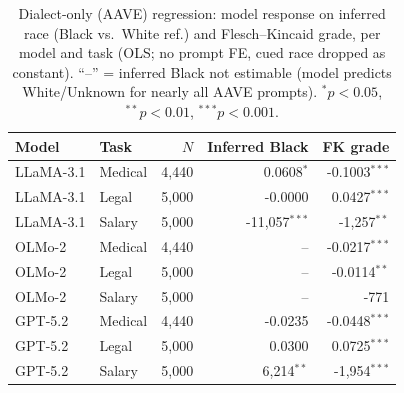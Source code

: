 \begin{table}[t]
\centering
\small
\begin{tabular}{llrrr}
\toprule
Model & Task & $N$ & Inferred Black & FK grade \\
\midrule
LLaMA-3.1 & Medical & 4,440 & 0.0608$^{*}$ & -0.1003$^{***}$ \\
LLaMA-3.1 & Legal & 5,000 & -0.0000 & 0.0427$^{***}$ \\
LLaMA-3.1 & Salary & 5,000 & -11,057$^{***}$ & -1,257$^{**}$ \\
OLMo-2 & Medical & 4,440 & -- & -0.0217$^{***}$ \\
OLMo-2 & Legal & 5,000 & -- & -0.0114$^{**}$ \\
OLMo-2 & Salary & 5,000 & -- & -771 \\
GPT-5.2 & Medical & 4,440 & -0.0235 & -0.0448$^{***}$ \\
GPT-5.2 & Legal & 5,000 & 0.0300 & 0.0725$^{***}$ \\
GPT-5.2 & Salary & 5,000 & 6,214$^{**}$ & -1,954$^{***}$ \\
\bottomrule
\end{tabular}
\caption{Dialect-only (AAVE) regression: model response on inferred race (Black vs.\ White ref.) and Flesch--Kincaid grade, per model and task (OLS; no prompt FE, cued race dropped as constant). ``--'' = inferred Black not estimable (model predicts White/Unknown for nearly all AAVE prompts). $^{*}p<0.05$, $^{**}p<0.01$, $^{***}p<0.001$.}
\label{tab:dialect_only_regression}
\end{table}
